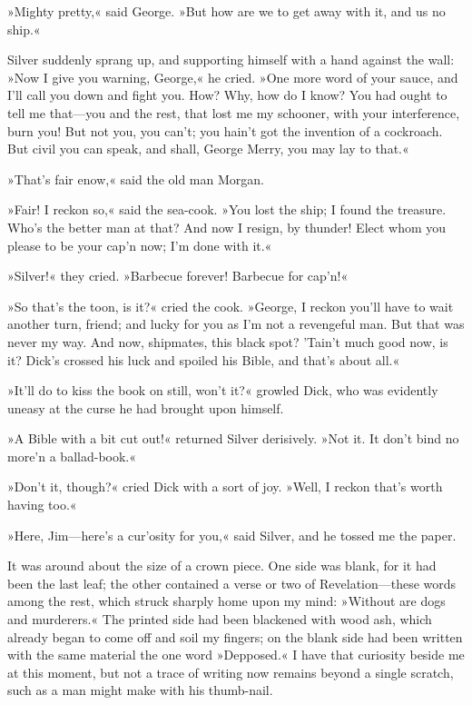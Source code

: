 »Mighty pretty,« said George. »But how are we to get away with it, and us no ship.«

Silver suddenly sprang up, and supporting himself with a hand against the wall: »Now I give you warning, George,« he cried. »One more word of your sauce, and I'll call you down and fight you. How? Why, how do I know? You had ought to tell me that—you and the rest, that lost me my schooner, with your interference, burn you! But not you, you can't; you hain't got the invention of a cockroach. But civil you can speak, and shall, George Merry, you may lay to that.«

»That's fair enow,« said the old man Morgan.

»Fair! I reckon so,« said the sea-cook. »You lost the ship; I found the treasure. Who's the better man at that? And now I resign, by thunder! Elect whom you please to be your cap'n now; I'm done with it.«

»Silver!« they cried. »Barbecue forever! Barbecue for cap'n!«

»So that's the toon, is it?« cried the cook. »George, I reckon you'll have to wait another turn, friend; and lucky for you as I'm not a revengeful man. But that was never my way. And now, shipmates, this black spot? 'Tain't much good now, is it? Dick's crossed his luck and spoiled his Bible, and that's about all.«

»It'll do to kiss the book on still, won't it?« growled Dick, who was evidently uneasy at the curse he had brought upon himself.

»A Bible with a bit cut out!« returned Silver derisively. »Not it. It don't bind no more'n a ballad-book.«

»Don't it, though?« cried Dick with a sort of joy. »Well, I reckon that's worth having too.«

»Here, Jim—here's a cur'osity for you,« said Silver, and he tossed me the paper.

It was around about the size of a crown piece. One side was blank, for it had been the last leaf; the other contained a verse or two of Revelation—these words among the rest, which struck sharply home upon my mind: »Without are dogs and murderers.« The printed side had been blackened with wood ash, which already began to come off and soil my fingers; on the blank side had been written with the same material the one word »Depposed.« I have that curiosity beside me at this moment, but not a trace of writing now remains beyond a single scratch, such as a man might make with his thumb-nail.

